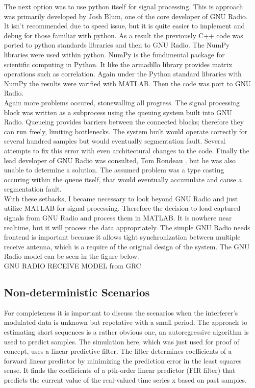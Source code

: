 The next option was to use python itself for signal processing.  This is approach was primarily developed by Josh Blum, one of the core developer of GNU Radio.  It isn't recommended due to speed issue, but it is quite easier to implement and debug for those familiar with python.  As a result the previously C++ code was ported to python standards libraries and then to GNU Radio.  The NumPy libraries were used within python.  NumPy is the fundimental package for scientific computing in Python\cite{numpy}.  It like the armadillo library provides matrix operations such as correlation.  Again under the Python standard libraries with NumPy the results were varified with MATLAB.  Then the code was port to GNU Radio.\\

Again more problems occured, stonewalling all progress.  The signal processing block was written as a subprocess using the queuing system built into GNU Radio.  Queueing provides barriers between the connected blocks; therefore they can run freely, limiting bottlenecks. The system built would operate correctly for several hundred samples but would eventually segmentation fault.  Several attempts to fix this error with even architectural changes to the code.  Finally the lead developer of GNU Radio was consulted, Tom Rondeau \cite{tomrondeau}, but he was also unable to determine a solution.  The assumed problem was a type casting occuring within the queue itself, that would eventually accumulate and cause a segmentation fault.\\

With these setbacks, I became necessary to look beyond GNU Radio and just utilize MATLAB for signal processing.  Therefore the decision to load captured signals from GNU Radio and process them in MATLAB.  It is nowhere near realtime, but it will process the data appropriately.  The simple GNU Radio needs frontend is important because it allows tight synchronization between multiple receive antenna, which is a require of the original design of the system.  The GNU Radio model can be seen in the figure below.\\

GNU RADIO RECEIVE MODEL from GRC\\

\subsection{Non-deterministic Scenarios}

For completeness it is important to discuss the scenarios when the interferer's modulated data is unknown but repetative with a small period.  The approach to estimating short sequences is a rather obvious one, an autoregressive algorithm is used to predict samples.  The simulation here, which was just used for proof of concept, uses a linear predictive filter.  The filter determines coefficients of a forward linear predictor by minimizing the prediction error in the least squares sense\cite{lpcfilter}.  It finds the coefficients of a pth-order linear predictor (FIR filter) that predicts the current value of the real-valued time series x based on past samples.

